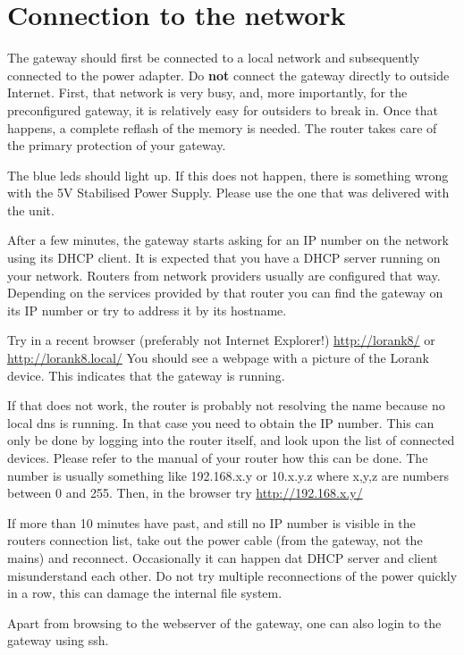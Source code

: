 \documentclass[12pt]{article}
\begin{document}
\section{Connection to the network}
The gateway should first be connected to a local network and subsequently connected to the power adapter.
Do {\bf not} connect the gateway directly to outside Internet. First, that network is very busy, and,
more importantly, for the preconfigured gateway, it is relatively easy for outsiders to break in.
Once that happens, a complete reflash of the memory is needed. The router takes care of the primary
protection of your gateway. 

The blue leds should light up. If this does not happen, there is something wrong with the
5V Stabilised Power Supply. Please use the one that was delivered with the unit. 

After a few minutes, the gateway starts asking for an IP number on the network using its DHCP client. 
It is expected that you have a DHCP server running on your network. 
Routers from network providers usually are configured that way. Depending on the services provided
by that router you can find the gateway on its IP number or try to address it by its hostname.

Try in a recent browser (preferably not Internet Explorer!) \url{http://lorank8/} or \url{http://lorank8.local/}
You should see a webpage with a picture of the Lorank device. This indicates that the gateway is running.

If that does not work, the router is probably not resolving  the name because no local dns is 
running. In that case you need to obtain the IP number. This can only be done by logging into 
the router itself, and look upon the list of connected devices. Please refer to the manual of 
your router how this can be done. The number is usually something like 192.168.x.y or 
10.x.y.z where x,y,z are numbers between 0 and 255. Then, in the browser try  \url{http://192.168.x.y/}

If more than 10 minutes have past, and still no IP number is visible in the routers connection
list, take out the power cable (from the gateway, not the mains) and reconnect. Occasionally it
can happen dat DHCP server and client misunderstand each other. Do not try multiple reconnections 
of the power quickly in a row, this can damage the internal file system.

Apart from browsing to the webserver of the gateway, one can also login to the gateway using ssh.
\end{document}
